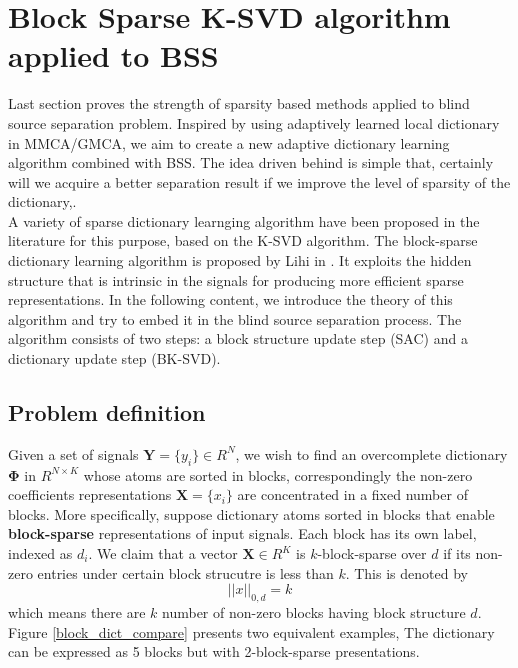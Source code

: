 \section{Block Sparse K-SVD algorithm applied to BSS}
Last section proves the strength of sparsity based methods applied to blind source separation problem. Inspired by using adaptively learned local dictionary in MMCA/GMCA, we aim to create a new adaptive dictionary learning algorithm combined with BSS. The idea driven behind is simple that, certainly will we acquire a better separation result if we improve the level of sparsity of the dictionary,.\\

A variety of sparse dictionary learnging algorithm have been proposed in the literature for this purpose, based on the K-SVD algorithm. The block-sparse dictionary learning algorithm is proposed by Lihi in \cite{dictionary_block_sparse}. It exploits the hidden structure that is intrinsic in the signals for producing more efficient sparse representations. In the following content, we introduce the theory of this algorithm and try to embed it in the blind source separation process. The algorithm consists of two steps: a block structure update step (SAC) and a dictionary update step (BK-SVD). \\

\subsection{Problem definition}
Given a set of signals $\mathbf{Y} = \{y_i\} \in R^N$, we wish to find an overcomplete dictionary $\mathbf{\Phi}$ in $R^{N \times K}$ whose atoms are sorted in blocks, correspondingly the non-zero coefficients representations $\mathbf{X} = \{x_i\}$ are concentrated in a fixed number of blocks. More specifically, suppose dictionary atoms sorted in blocks that enable \textbf{block-sparse} representations of input signals. Each block has its own label, indexed as $d_i$. We claim that a vector $\mathbf{X}\in R^K$ is $k$-block-sparse over $d$ if its non-zero entries under certain block strucutre is less than $k$. This is denoted by 
\begin{equation}
    ||x||_{0,d} = k
\end{equation}
which means there are $k$ number of non-zero blocks having block structure $d$. Figure \ref{block_dict_compare} presents two equivalent examples, The dictionary can be expressed as 5 blocks but with 2-block-sparse presentations.\\

